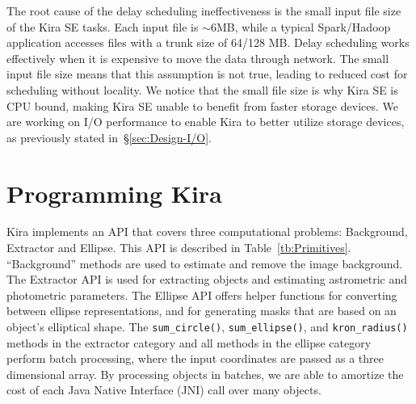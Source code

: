 \documentclass[10pt, conference, compsocconf]{IEEEtran}
\begin{document}
The root cause of the delay scheduling ineffectiveness is the small input file size of the Kira SE tasks. 
Each input file is $\sim$6MB, while a typical Spark/Hadoop application accesses files with a trunk size of 64/128 MB.
Delay scheduling works effectively when it is expensive to move the data through network. The small input
file size means that this assumption is not true, leading to reduced cost for scheduling without locality.
We notice that the small file size is why Kira SE is CPU bound, making Kira SE
unable to benefit from faster storage devices. 
We are working on I/O performance to enable Kira to better utilize storage devices, as previously stated in~\S\ref{sec:Design-I/O}.
 
\section{Programming Kira}
\label{sec:Programming}
Kira implements an API that covers three computational problems: Background, Extractor and Ellipse. This API is described
in Table~\ref{tb:Primitives}. ``Background'' methods are used to estimate and remove the image background. The Extractor
API is used for extracting objects and estimating astrometric and photometric parameters. The Ellipse API offers helper
functions for converting between ellipse representations, and for generating masks that are based on an object's elliptical
shape. The \texttt{sum\_circle()}, \texttt{sum\_ellipse()}, and \texttt{kron\_radius()} methods in the extractor category and all
methods in the ellipse category perform batch processing, where the input coordinates are passed as a three dimensional array. By processing objects
in batches, we are able to amortize the cost of each Java Native Interface (JNI) call over many objects.
\end{document}
